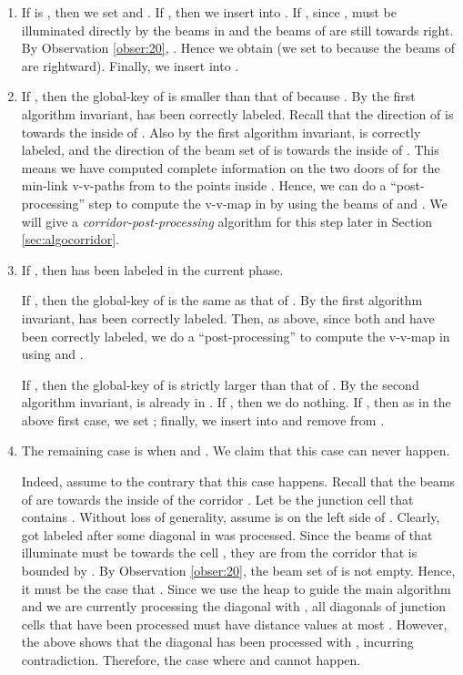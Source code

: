 \documentclass[english,runningheads,11pt]{llncs-revised}
\begin{document}
\begin{enumerate}
\item
If  is , then we set  and .
If , then we insert  into .
If , since ,  must be
illuminated directly by the beams in  and the beams of  are still towards right.
By Observation \ref{obser:20}, .
Hence we obtain  (we set  to 
because the beams of  are rightward).  Finally, we insert  into .

\item
If , then the global-key of  is smaller than that of  because . By the first algorithm invariant,  has been
correctly labeled. Recall that the direction of  is towards the inside of .
Also by the first algorithm invariant,  is
correctly labeled, and the direction of the beam set of  is
towards the inside of . This means we have computed complete information on the
two doors of  for the min-link v-v-paths from  to the points
inside . Hence, we can do a ``post-processing'' step to
compute the v-v-map in  by using the beams of  and
. We will give a {\em corridor-post-processing} algorithm for this step later in Section \ref{sec:algocorridor}.

\item
If , then  has been labeled in the current phase.

If , then the global-key of  is the same as that of . By
the first algorithm invariant,  has been correctly labeled. Then, as
above, since both  and  have been correctly
labeled, we do a ``post-processing'' to compute the
v-v-map in  using  and .

If , then the global-key of  is strictly larger than that of
. By the second algorithm invariant,  is already in .
If , then we do nothing.
If , then as in the above first case, we set ;
finally, we insert  into  and remove  from .


\item
The remaining case is when  and .
We claim that this case can never happen.

Indeed, assume to the contrary that this case happens. Recall that the beams of  are towards the inside of the corridor . Let  be the junction cell that contains . Without loss of generality, assume  is on the left side of .
Clearly,  got labeled after some diagonal  in  was processed.
Since the beams of  that illuminate  must be towards the cell , they
are from the corridor that is bounded by . By Observation
\ref{obser:20}, the beam set of  is not empty. Hence, it must be
the case that . Since we use the heap  to guide the main algorithm and we are currently processing the diagonal  with , all diagonals of junction cells that have been processed must have distance values at most . However, the above shows that the diagonal 
has been processed with , incurring contradiction. Therefore, the case where  and
 cannot happen.
\end{enumerate}
\end{document}
